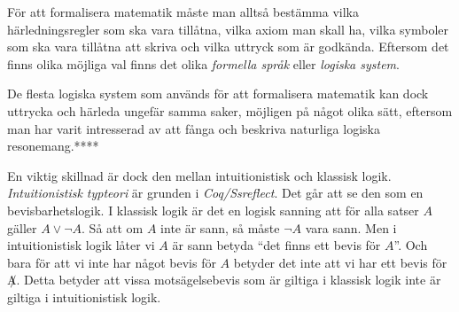 För att formalisera matematik måste man alltså bestämma vilka härledningsregler
som ska vara tillåtna, vilka axiom man skall ha, vilka symboler som ska vara
tillåtna att skriva och vilka uttryck som är godkända. Eftersom det finns olika
möjliga val finns det olika \emph{formella språk} eller \emph{logiska system}.


De flesta logiska system som används för att formalisera matematik kan dock
uttrycka och härleda ungefär samma saker, möjligen på något olika sätt,
eftersom man har varit intresserad av att fånga och beskriva naturliga logiska
resonemang.****


En viktig skillnad är dock den mellan intuitionistisk och klassisk logik.
\emph{Intuitionistisk typteori}\cite{martin1984intuitionistic} är grunden i
\emph{Coq/Ssreflect}\cite{bertot2004interactive}. Det går att se den som en
bevisbarhetslogik. I klassisk logik är det en logisk sanning att för alla
satser $A$ gäller $A \lor \neg A$. Så att om $A$ inte är sann, så måste
$\neg A$ vara sann. Men i intuitionistisk logik låter vi $A$ är sann betyda
``det finns ett bevis för $A$''. Och bara för att vi inte har något bevis för
$A$ betyder det inte att vi har ett bevis för $\not A$. Detta betyder att vissa
motsägelsebevis som är giltiga i klassisk logik inte är giltiga i
intuitionistisk logik. \cite{proofdependent}
